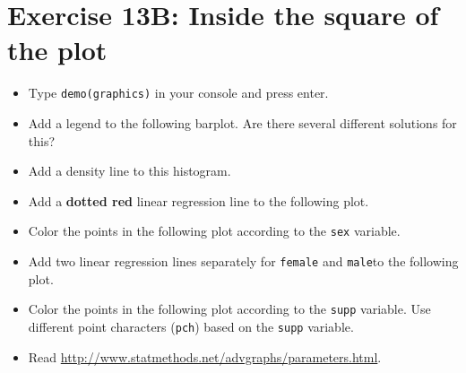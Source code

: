 \documentclass[11pt]{article}\usepackage[]{graphicx}\usepackage[]{color}
\begin{document}
\section*{Exercise 13B: Inside the square of the plot}
\begin{itemize}
\item Type \texttt{demo(graphics)} in your console and press enter.
\item Add a legend to the following barplot. Are there several different solutions
for this?


\item Add a density line to this histogram.


\item Add a \textbf{dotted red} linear regression line to the following plot.


\item Color the points in the following plot according to the \texttt{sex} variable.


\item Add two linear regression lines separately for \texttt{female} and \texttt{male}to the following plot.


\item Color the points in the following plot according to the \texttt{supp} variable.
Use different point characters (\texttt{pch}) based on the \texttt{supp} variable.


\item Read \url{http://www.statmethods.net/advgraphs/parameters.html}.
\end{itemize}
\end{document}
